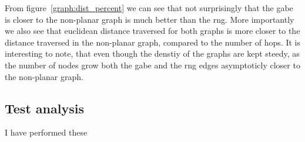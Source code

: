 
From figure~\ref{graph:dist_percent} we can see that not surprisingly that the \ac{gabe} is closer to the non-planar graph is much better than the \ac{rng}. More importantly we also see that euclidean distance traversed for both graphs is more closer to the distance traversed in the non-planar graph, compared to the number of hops. It is interesting to note, that even though the denstiy of the graphs are kept steedy, as the number of nodes grow both the \ac{gabe} and the \ac{rng} edges asymptoticly closer to the non-planar graph. 

\subsubsection{}






\subsection{Test analysis}


I have performed these


\subsection{}
\label{section:test_results_spanners}
